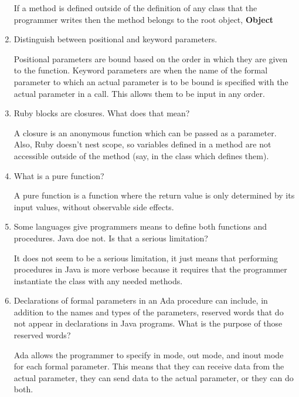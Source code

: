 \begin{enumerate}
    \begin{answer}
If a method is defined outside of the definition of any class that the programmer writes then the method belongs to the root object, \textbf{Object}
    \end{answer}

  \item Distinguish between positional and keyword parameters.

	\begin{answer}
Positional parameters are bound based on the order in which they are given to the function. Keyword parameters are when the name of the formal parameter to which an actual parameter is to be bound is specified with the actual parameter in a call. This allows them to be input in any order.
	\end{answer}

  \item Ruby blocks are closures. What does that mean?

    \begin{answer}
      A closure is an anonymous function which can be passed as a parameter. Also, Ruby doesn't nest scope, so variables defined in a method are not accessible outside of the method (say, in the class which defines them).
    \end{answer}
  \item What is a pure function?
    \begin{answer}
A pure function is a function where the return value is only determined by its input values, without observable side effects.
    \end{answer}

  \item Some languages give programmers means to define
    both functions and procedures. Java doe not. Is that
    a serious limitation?
  \begin{answer}
      It does not seem to be a serious limitation, it just means that performing procedures in Java is more verbose because it requires that the programmer instantiate the class with any needed methods.
   \end{answer}
  \item Declarations of formal parameters in an Ada procedure
    can include, in addition to the names and types of the
    parameters, reserved words that do not appear in declarations
    in Java programs.
    What is the purpose of those reserved words?
    
        \begin{answer}
Ada allows the programmer to specify in mode, out mode, and inout mode for each formal parameter.  This means that they can receive data from the actual parameter, they can send data to the actual parameter, or they can do both.
	\end{answer}
 

\end{enumerate}

